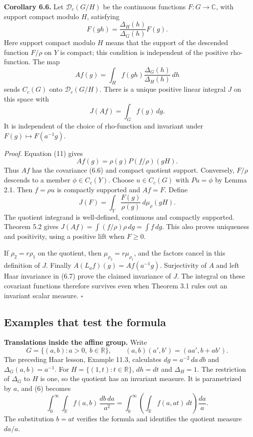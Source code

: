 \documentclass[
  english,
  11pt,
  a4paper,
]{article}
\begin{document}
\textbf{Corollary 6.6.} Let \(\mathcal D_c(G/H)\) be the continuous
functions \(F:G\to\mathbb C\), with support compact modulo \(H\),
satisfying \[F(gh)=\frac{\Delta_H(h)}{\Delta_G(h)}F(g).
\tag{6.6}\] Here support compact modulo \(H\) means that the support of
the descended function \(F/\rho\) on \(Y\) is compact; this condition is
independent of the positive rho-function. The map
\[Af(g)=\int_H f(gh)\frac{\Delta_G(h)}{\Delta_H(h)}\,dh\] sends
\(C_c(G)\) onto \(\mathcal D_c(G/H)\). There is a unique positive linear
integral \(J\) on this space with \[J(Af)=\int_G f(g)\,dg.
\tag{6.7}\] It is independent of the choice of rho-function and
invariant under \(F(g)\mapsto F(a^{-1}g)\).

\emph{Proof.} Equation (11) gives \[Af(g)=\rho(g)P(f/\rho)(gH).\] Thus
\(Af\) has the covariance (6.6) and compact quotient support.
Conversely, \(F/\rho\) descends to a member \(\phi\in C_c(Y)\). Choose
\(u\in C_c(G)\) with \(Pu=\phi\) by Lemma 2.1. Then \(f=\rho u\) is
compactly supported and \(Af=F\). Define
\[J(F)=\int_Y\frac{F(g)}{\rho(g)}\,d\mu_\rho(gH).\] The quotient
integrand is well-defined, continuous and compactly supported. Theorem
5.2 gives \(J(Af)=\int(f/\rho)\rho\,dg=\int f\,dg\). This also proves
uniqueness and positivity, using a positive lift when \(F\geq0\).

If \(\rho_2=r\rho_1\) on the quotient, then
\(\mu_{\rho_2}=r\mu_{\rho_1}\), and the factors cancel in this
definition of \(J\). Finally \(A(L_af)(g)=Af(a^{-1}g)\). Surjectivity of
\(A\) and left Haar invariance in (6.7) prove the claimed invariance of
\(J\). The integral on these covariant functions therefore survives even
when Theorem 3.1 rules out an invariant scalar measure. \(\square\)

\subsection{Examples that test the
formula}\label{quotient-measures-and-weils-integration-formula--examples-that-test-the-formula}

\textbf{Translations inside the affine group.} Write
\[G=\{(a,b):a>0,\ b\in\mathbb R\},\qquad
(a,b)(a',b')=(aa',b+ab').\] The preceding Haar lesson, Example 11.3,
calculates \(dg=a^{-2}\,da\,db\) and \(\Delta_G(a,b)=a^{-1}\). For
\(H=\{(1,t):t\in\mathbb R\}\), \(dh=dt\) and \(\Delta_H=1\). The
restriction of \(\Delta_G\) to \(H\) is one, so the quotient has an
invariant measure. It is parametrized by \(a\), and (6) becomes
\[\int_0^\infty\int_{\mathbb R}f(a,b)\,\frac{db\,da}{a^2}
=\int_0^\infty\left(\int_{\mathbb R}f(a,at)\,dt\right)\frac{da}{a}.
\tag{19}\] The substitution \(b=at\) verifies the formula and identifies
the quotient measure \(da/a\).
\end{document}
